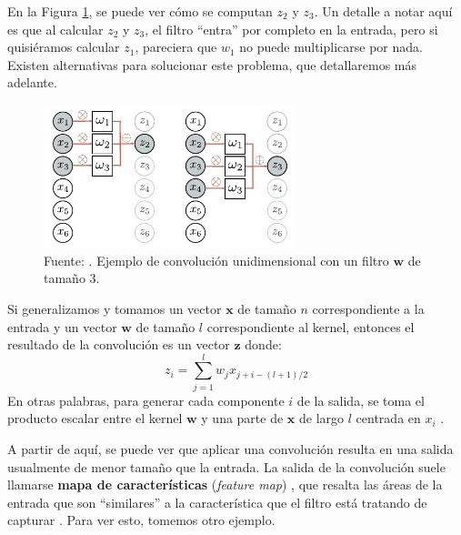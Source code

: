 \documentclass[../../main.tex]{subfiles}
\begin{document}
En la Figura \ref{fig:conv1d-example}, se puede ver cómo se computan \(z_2\) y \(z_3\).
Un detalle a notar aquí es que al calcular \(z_2\) y \(z_3\), el filtro ``entra''
por completo en la entrada, pero si quisiéramos calcular \(z_1\), pareciera que \(w_1\)
no puede multiplicarse por nada. Existen alternativas para solucionar este problema,
que detallaremos más adelante.

\begin{figure}
    \centering
    \includegraphics[width=0.65\textwidth]{figs/conv1d-example1.png}
    \caption{Fuente: \cite{prince2024understanding}. Ejemplo de convolución unidimensional
    con un filtro \(\bm{w}\) de tamaño 3.}
    \label{fig:conv1d-example}
\end{figure}

Si generalizamos y tomamos un vector \(\bm{x}\) de tamaño \(n\) correspondiente
a la entrada y un vector \(\bm{w}\) de tamaño \(l\) correspondiente al kernel,
entonces el resultado de la convolución es un vector \(\bm{z}\) donde:
\begin{equation}
    z_i = \sum_{j=1}^l w_j x_{j+i-(l+1)/2}
    \label{eq:convolution}
\end{equation}
En otras palabras, para generar cada componente \(i\) de la salida, se toma el producto
escalar entre el kernel \(\bm{w}\) y una parte de \(\bm{x}\) de largo \(l\) centrada en
\(x_i\) \cite{ai-a-modern-approach}.

A partir de aquí, se puede ver que aplicar una convolución resulta en una salida
usualmente de menor tamaño que la entrada. La salida de la convolución suele llamarse
\textbf{mapa de características} (\textit{feature map}) \cite{deep-learning}, que resalta
las áreas de la entrada que son ``similares'' a la característica que el filtro está
tratando de capturar \cite{hands-on-ML-sklearn-tf}. Para ver esto, tomemos otro ejemplo.
\end{document}
